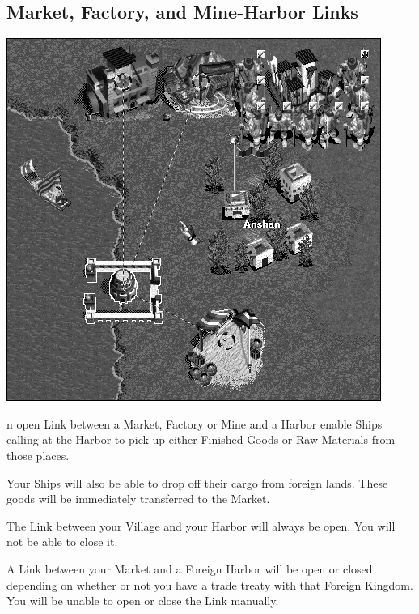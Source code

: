 \subsection{\textsf{Market, Factory, and Mine-Harbor Links}}


\begin{center}
    \includegraphics[width=0.95\linewidth]{Ilink_harbor} %
\end{center}

n open Link between a Market, Factory or Mine and a Harbor enable Ships calling at the Harbor to pick up either Finished Goods or Raw Materials from those places.

Your Ships will also be able to drop off their cargo from foreign lands. These goods will be immediately transferred to the Market.

The Link between your Village and your Harbor will always be open. You will not be able to close it.

A Link between your Market and a Foreign Harbor will be open or closed depending on whether or not you have a trade treaty with that Foreign Kingdom. You will be unable to open or close the Link manually.
